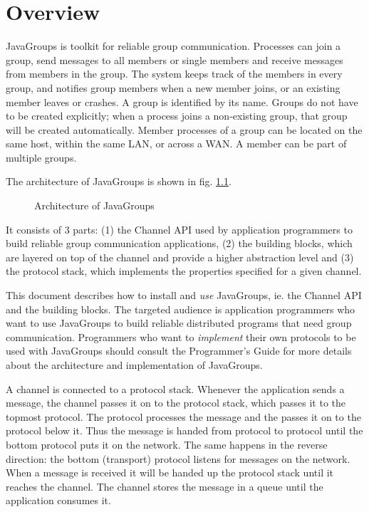 


\chapter{Overview} \label{Overview}

JavaGroups is toolkit for reliable group communication. Processes can join a group,
send messages to all members or single members and receive messages from members in
the group. The system keeps track of the members in every group, and notifies group
members when a new member joins, or an existing member leaves or crashes. A group
is identified by its name. Groups do not have to be created explicitly; when a
process joins a non-existing group, that group will be created
automatically. Member processes of a group can be located on the same host, within
the same LAN, or across a WAN. A member can be part of multiple groups.


The architecture of JavaGroups is shown in fig. \ref{ArchitectureFig}.


\begin{figure}[htb]
    \caption{Architecture of JavaGroups}
    \label{ArchitectureFig}
\end{figure}

It consists of 3 parts: (1) the Channel API used by application programmers to
build reliable group communication applications, (2) the building blocks, which are
layered on top of the channel and provide a higher abstraction level and (3) the
protocol stack, which implements the properties specified for a given
channel.

This document describes how to install and {\em use} JavaGroups, ie. the Channel API and
the building blocks. The targeted audience is application programmers who want to use
JavaGroups to build reliable distributed programs that need group
communication. Programmers who want to {\em implement} their own protocols to be used with
JavaGroups should consult the Programmer's Guide for more details about the
architecture and implementation of JavaGroups.

A channel is connected to a protocol stack. Whenever the application sends a message,
the channel passes it on to the protocol stack, which passes it to the topmost
protocol. The protocol processes the message and the passes it on to the protocol
below it. Thus the message is handed from protocol to protocol until the bottom
protocol puts it on the network. The same happens in the reverse direction: the
bottom (transport) protocol listens for messages on the network. When a message is
received it will be handed up the protocol stack until it reaches the channel. The
channel stores the message in a queue until the application consumes it.

